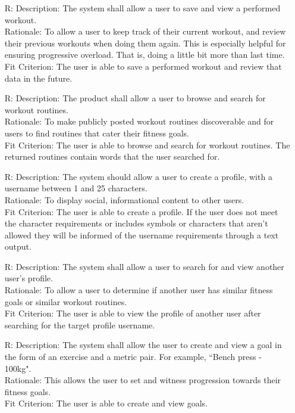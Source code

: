 \documentclass[12pt]{article}
\newcounter{reqnum} %
\begin{document}
\begin{itemize}
\item[R\refstepcounter{reqnum}\thereqnum \label{R_Inputs}:]
Description: The system shall allow a user to save and view a performed workout.
\\ Rationale: To allow a user to keep track of their current workout, and review their previous workouts when doing them again.
This is especially helpful for ensuring progressive overload. That is, doing a little bit more than last time.
\\ Fit Criterion: The user is able to save a performed workout and review that data in the future.

\item[R\refstepcounter{reqnum}\thereqnum \label{R_Inputs}:]
Description: The product shall allow a user to browse and search for workout routines.
\\ Rationale: To make publicly posted workout routines discoverable and for users to find routines that cater their fitness goals.
\\ Fit Criterion: The user is able to browse and search for workout routines. The returned routines contain words that the user searched for.

\item[R\refstepcounter{reqnum}\thereqnum \label{R_Inputs}:]
Description: The system should allow a user to create a profile, with a username between 1 and 25 characters.
\\ Rationale: To display social, informational content to other users.
\\ Fit Criterion: The user is able to create a profile. If the user does not meet the character requirements or includes symbols or characters that aren't allowed they will be informed of the username requirements through a text output.


\item[R\refstepcounter{reqnum}\thereqnum \label{R_Inputs}:]
Description: The system shall allow a user to search for and view another user's profile.
\\ Rationale: To allow a user to determine if another user has similar fitness goals or similar workout routines.
\\ Fit Criterion: The user is able to view the profile of another user after searching for the target profile username.

\item[R\refstepcounter{reqnum}\thereqnum \label{R_Inputs}:]
Description: The system shall allow the user to create and view a goal in the form of an exercise and a metric pair. For example, ``Bench press - 100kg".
\\ Rationale: This allows the user to set and witness progression towards their fitness goals.
\\ Fit Criterion: The user is able to create and view goals.


\end{itemize}
\end{document}

